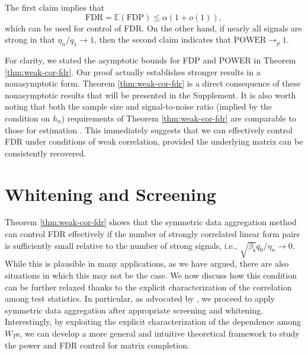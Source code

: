 \documentclass[12pt]{article}
\newcommand{\E}{\mathbb{E}}
\theoremstyle{plain}
\begin{document}
\begin{sloppypar}
The first claim implies that
\begin{equation}\label{eq:fdr-exp}
	\text{FDR}=\E (\text{FDP})\le \alpha(1+o(1)),
\end{equation}
which can be used for control of FDR. On the other hand, if nearly all signals are strong in that $\eta_n/q_1\to 1$, then the second claim indicates that $\text{POWER}\to_p 1$. 

For clarity, we stated the asymptotic bounds for FDP and POWER in Theorem \ref{thm:weak-cor-fdr}. Our proof actually establishes stronger results in a nonasymptotic form. Theorem \ref{thm:weak-cor-fdr} is a direct consequence of these nonasymptotic results that will be presented in the Supplement. It is also worth noting that both the sample size and signal-to-noise ratio (implied by the condition on $h_n$) requirements of Theorem \ref{thm:weak-cor-fdr} are comparable to those for estimation \citep{keshavan2010matrix_b,ma2018implicit,xia2021statistical}. This immediately suggests that we can effectively control FDR under conditions of weak correlation, provided the underlying matrix can be consistently recovered.

\section{Whitening and Screening}\label{sec:strong-corr}
Theorem \ref{thm:weak-cor-fdr} shows that the symmetric data aggregation method can control FDR effectively if the number of strongly correlated linear form pairs is sufficiently small relative to the number of strong signals, i.e., $\sqrt{\beta_{\mathsf{s}}}q_0/\eta_n\to 0$. While this is plausible in many applications, as we have argued, there are also situations in which this may not be the case. We now discuss how this condition can be further relaxed thanks to the explicit characterization of the correlation among test statistics. In particular, as advocated by \cite{du2021false}, we proceed to apply symmetric data aggregation after appropriate screening and whitening. Interestingly, by exploiting the explicit characterization of the dependence among $W_T$s, we can develop a more general and intuitive theoretical framework to study the power and FDR control for matrix completion.


\end{sloppypar}
\end{document}
